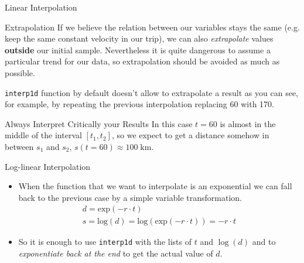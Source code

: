 \documentclass{beamer}
\begin{document}
\begin{frame}{Linear Interpolation}
  \begin{block}{Extrapolation}
    If we believe the relation between our variables stays the same (e.g. keep the same constant velocity in our trip), we can also \emph{extrapolate} values \textbf{outside} our initial sample.
    Nevertheless it is quite dangerous to assume a particular trend for our data, so extrapolation should be avoided as much as possible.

    \texttt{interp1d} function by default doesn't allow to extrapolate a result as you can see, for example, by repeating the previous interpolation replacing 60 with 170.
  \end{block}

  \begin{block}{Always Interpret Critically your Results}
    In this case $t=60$ is almost in the middle of the interval $[t_1, t_2]$, so we expect to get a distance somehow in between $s_1$ and $s_2$, $s(t=60) \approx 100\;\textrm{km}$.
  \end{block}
  \end{frame}

\begin{frame}{Log-linear Interpolation}
  \begin{itemize}
    \item When the function that we want to interpolate is an exponential we can fall back to the previous case by a simple variable transformation. 
      \begin{equation}
        \begin{gathered}
          d = \mathrm{exp}(-r\cdot t) \\
          s = \mathrm{log}(d) = \mathrm{log}(\mathrm{exp}(-r\cdot t)) = -r \cdot t
        \end{gathered}
      \end{equation}

    \item So it is enough to use \texttt{interp1d} with the lists of $t$ and $\log(d)$ and to \emph{exponentiate back at the end} to get the actual value of $d$.
  \end{itemize}
\end{frame}

\end{document}
